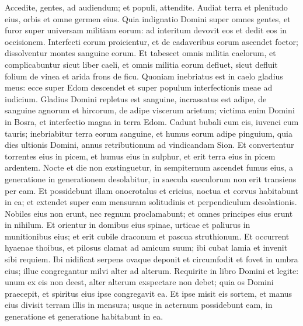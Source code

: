 \begin{biblechapter}  
\verse Accedite, gentes, ad audiendum; et populi, attendite. Audiat terra et plenitudo eius, orbis et omne germen eius. 
\verse Quia indignatio Domini super omnes gentes, et furor super universam militiam eorum: ad interitum devovit eos et dedit eos in occisionem. 
\verse Interfecti eorum proicientur, et de cadaveribus eorum ascendet foetor; dissolventur montes sanguine eorum. 
\verse Et tabescet omnis militia caelorum, et complicabuntur sicut liber caeli, et omnis militia eorum defluet, sicut defluit folium de vinea et arida frons de ficu. 
\verse Quoniam inebriatus est in caelo gladius meus: ecce super Edom descendet et super populum interfectionis meae ad iudicium. 
\verse Gladius Domini repletus est sanguine, incrassatus est adipe, de sanguine agnorum et hircorum, de adipe viscerum arietum; victima enim Domini in Bosra, et interfectio magna in terra Edom. 
\verse Cadunt bubali cum eis, iuvenci cum tauris; inebriabitur terra eorum sanguine, et humus eorum adipe pinguium, 
\verse quia dies ultionis Domini, annus retributionum ad vindicandam Sion. 
\verse Et convertentur torrentes eius in picem, et humus eius in sulphur, et erit terra eius in picem ardentem. 
\verse Nocte et die non exstinguetur, in sempiternum ascendet fumus eius, a generatione in generationem desolabitur, in saecula saeculorum non erit transiens per eam. 
\verse Et possidebunt illam onocrotalus et ericius, noctua et corvus habitabunt in ea; et extendet super eam mensuram solitudinis et perpendiculum desolationis. 
\verse Nobiles eius non erunt, nec regnum proclamabunt; et omnes principes eius erunt in nihilum. 
\verse Et orientur in domibus eius spinae, urticae et paliurus in munitionibus eius; et erit cubile draconum et pascua struthionum. 
\verse Et occurrent hyaenae thoibus, et pilosus clamat ad amicum suum; ibi cubat lamia et invenit sibi requiem. 
\verse Ibi nidificat serpens ovaque deponit et circumfodit et fovet in umbra eius; illuc congregantur milvi alter ad alterum. 
\verse Requirite in libro Domini et legite: unum ex eis non deest, alter alterum exspectare non debet; quia os Domini praecepit, et spiritus eius ipse congregavit ea. 
\verse Et ipse misit eis sortem, et manus eius divisit terram illis in mensura; usque in aeternum possidebunt eam, in generatione et generatione habitabunt in ea. 
\end{biblechapter}

